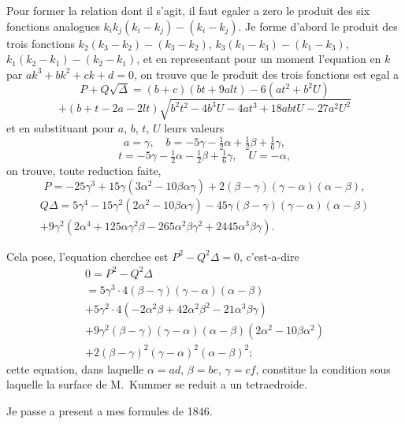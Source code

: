 \documentclass[11pt,a4paper]{article}
\theoremstyle{plain}
\begin{document}
Pour former la relation dont il s'agit, il faut egaler a zero le produit des six fonctions analogues $k_i k_j(k_i - k_j) - (k_i - k_j)$. Je forme d'abord le produit des trois fonctions $k_2(k_3-k_2)-(k_3-k_2)$, $k_3(k_1-k_3)-(k_1-k_3)$, $k_1(k_2-k_1)-(k_2-k_1)$, et en representant pour un moment l'equation en $k$ par $ak^3 + bk^2 + ck + d = 0$, on trouve que le produit des trois fonctions est egal a
\[
P + Q\sqrt{\Delta} = (b+c)(bt+9alt) - 6(at^2 + b^2U)
\]
\[
+ (b+t-2a-2lt)\sqrt{b^2t^2 - 4b^3U - 4at^3 + 18abtU - 27a^2U^2}
\]
et en substituant pour $a$, $b$, $t$, $U$ leurs valeurs
\[
a = \gamma, \quad b = -5\gamma - \tfrac12\alpha + \tfrac12\beta + \tfrac16\gamma,
\]
\[
t = -5\gamma - \tfrac12\alpha - \tfrac12\beta + \tfrac16\gamma, \quad U = -\alpha,
\]
on trouve, toute reduction faite,
\[
P = -25\gamma^3 + 15\gamma(3\alpha^2 - 10\beta\alpha\gamma) + 2(\beta-\gamma)(\gamma-\alpha)(\alpha-\beta),
\]
\begin{multline*}
Q\Delta = 5\gamma^4 - 15\gamma^2(2\alpha^2 - 10\beta\alpha\gamma) - 45\gamma(\beta-\gamma)(\gamma-\alpha)(\alpha-\beta) \\
+ 9\gamma^2(2\alpha^4 + 125\alpha\gamma^2\beta - 265\alpha^2\beta\gamma^2 + 2445\alpha^3\beta\gamma).
\end{multline*}

Cela pose, l'equation cherchee est $P^2 - Q^2\Delta = 0$, c'est-a-dire
\begin{multline*}
0 = P^2 - Q^2\Delta \\
= 5\gamma^3 \cdot 4(\beta-\gamma)(\gamma-\alpha)(\alpha-\beta) \\
+ 5\gamma^2 \cdot 4(-2\alpha^2\beta + 42\alpha^2\beta^2 - 21\alpha^3\beta\gamma) \\
+ 9\gamma^2(\beta-\gamma)(\gamma-\alpha)(\alpha-\beta)(2\alpha^2 - 10\beta\alpha^2) \\
+ 2(\beta-\gamma)^2(\gamma-\alpha)^2(\alpha-\beta)^2;
\end{multline*}
cette equation, dans laquelle $\alpha = ad$, $\beta = be$, $\gamma = cf$, constitue la condition sous laquelle la surface de M.~Kummer se reduit a un tetraedroide.

Je passe a present a mes formules de 1846.
\end{document}

